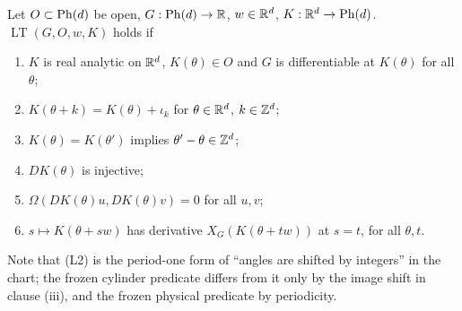 \begin{definition}\label{bpP:p1:lattice-torus}
Let $O\subset\mathrm{Ph}(d)$ be open, $G:\mathrm{Ph}(d)\to\mathbb{R}$, $w\in\mathbb{R}^d$, $K:\mathbb{R}^d\to\mathrm{Ph}(d)$. $\operatorname{LT}(G,O,w,K)$ holds if
\begin{enumerate}[label=(L\arabic*)]
\item $K$ is real analytic on $\mathbb{R}^d$, $K(\theta)\in O$ and $G$ is differentiable at $K(\theta)$ for all $\theta$;
\item $K(\theta+k)=K(\theta)+\iota_k$ for $\theta\in\mathbb{R}^d$, $k\in\mathbb{Z}^d$;
\item $K(\theta)=K(\theta')$ implies $\theta'-\theta\in\mathbb{Z}^d$;
\item $DK(\theta)$ is injective;
\item $\Omega(DK(\theta)u,DK(\theta)v)=0$ for all $u,v$;
\item $s\mapsto K(\theta+sw)$ has derivative $X_G(K(\theta+tw))$ at $s=t$, for all $\theta,t$.
\end{enumerate}
Note that (L2) is the period-one form of ``angles are shifted by integers'' in the chart; the frozen cylinder predicate differs from it only by the image shift in clause (iii), and the frozen physical predicate by periodicity.
\end{definition}

